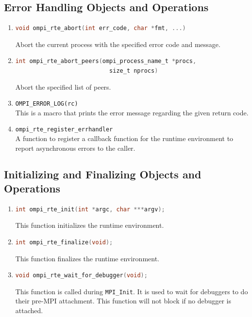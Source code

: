 \subsection{Error Handling Objects and Operations}
\begin{enumerate}
\item
  \begin{lstlisting}[language=C]
  void ompi_rte_abort(int err_code, char *fmt, ...)
  \end{lstlisting}
  Abort the current process with the specified error code and message.

\item
  \begin{lstlisting}[language=C]
  int ompi_rte_abort_peers(ompi_process_name_t *procs,
                           size_t nprocs)
  \end{lstlisting}
  Abort the specified list of peers.
  
\item \verb|OMPI_ERROR_LOG(rc)|\\
  This is a macro that prints the error message regarding the given return code.
  
\item \verb|ompi_rte_register_errhandler|\\
  A function to register a callback function for the runtime environment to report asynchronous errors to the caller.
\end{enumerate}


\subsection{Initializing and Finalizing Objects and Operations}

\begin{enumerate}
\item 
  \begin{lstlisting}[language=C]
  int ompi_rte_init(int *argc, char ***argv);
  \end{lstlisting}
  This function initializes the runtime environment.
  
\item 
  \begin{lstlisting}[language=C]
  int ompi_rte_finalize(void);
  \end{lstlisting}
  This function finalizes the runtime environment.
  
\item
  \begin{lstlisting}[language=C]
  void ompi_rte_wait_for_debugger(void);
  \end{lstlisting}
  This function is called during \verb|MPI_Init|. It is used to wait for debuggers to do their pre-MPI attachment. This function will not block if no debugger is attached.
\end{enumerate}


